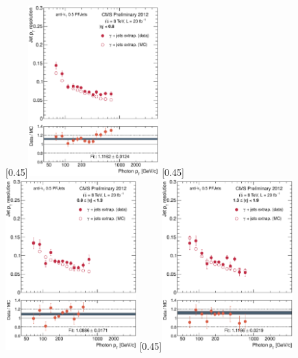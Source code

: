 \begin{figure}[p]
    \centering
    \subcaptionbox{\label{fig:reso_bal_extrap_eta008}}[0.45\textwidth]{\includegraphics[width=0.45\textwidth]{chapitre4/figs/reso_balancing_extrap/resolution_eta008_balancing_extrap.eps}}\hfill
    \subcaptionbox{\label{fig:reso_bal_extrap_eta0813}}[0.45\textwidth]{\includegraphics[width=0.45\textwidth]{chapitre4/figs/reso_balancing_extrap/resolution_eta0813_balancing_extrap.eps}}
    \subcaptionbox{\label{fig:reso_bal_extrap_eta1319}}[0.45\textwidth]{\includegraphics[width=0.45\textwidth]{chapitre4/figs/reso_balancing_extrap/resolution_eta1319_balancing_extrap.eps}}\hfill

\end{figure}
